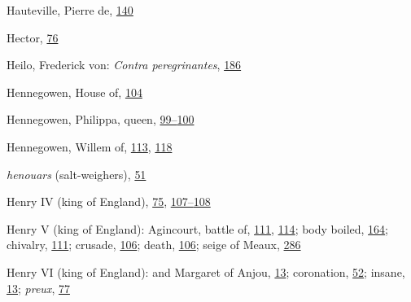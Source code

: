 Hauteville, Pierre de,
\protect\hyperlink{11_Chapter_Four__THE_FORMS_OF_LOVE.xhtmlux5cux23page_140}{140}

Hector,
\protect\hyperlink{10_Chapter_Three__THE_HEROIC_DREAM.xhtmlux5cux23page_76}{76}

Heilo, Frederick von: \emph{Contra peregrinantes},
\protect\hyperlink{13_Chapter_Six__THE_DEPICTION_OF_TH.xhtmlux5cux23page_186}{186}

Hennegowen, House of,
\protect\hyperlink{10_Chapter_Three__THE_HEROIC_DREAM.xhtmlux5cux23page_104}{104}

Hennegowen, Philippa, queen,
\protect\hyperlink{10_Chapter_Three__THE_HEROIC_DREAM.xhtmlux5cux23page_99}{99--}\protect\hyperlink{10_Chapter_Three__THE_HEROIC_DREAM.xhtmlux5cux23page_100}{100}

Hennegowen, Willem of,
\protect\hyperlink{10_Chapter_Three__THE_HEROIC_DREAM.xhtmlux5cux23page_113}{113},
\protect\hyperlink{10_Chapter_Three__THE_HEROIC_DREAM.xhtmlux5cux23page_118}{118}

\emph{henouars} (salt-weighers),
\protect\hyperlink{09_Chapter_Two__THE_CRAVING_FOR_A_M.xhtmlux5cux23page_51}{51}

Henry IV (king of England),
\protect\hyperlink{10_Chapter_Three__THE_HEROIC_DREAM.xhtmlux5cux23page_75}{75},
\protect\hyperlink{10_Chapter_Three__THE_HEROIC_DREAM.xhtmlux5cux23page_107}{107--}\protect\hyperlink{10_Chapter_Three__THE_HEROIC_DREAM.xhtmlux5cux23page_108}{108}

Henry V (king of England):
Agin\protect\hypertarget{25_INDEX.xhtmlux5cux23page_459}{}{}court,
battle of,
\protect\hyperlink{10_Chapter_Three__THE_HEROIC_DREAM.xhtmlux5cux23page_111}{111},
\protect\hyperlink{10_Chapter_Three__THE_HEROIC_DREAM.xhtmlux5cux23page_114}{114};
body boiled,
\protect\hyperlink{12_Chapter_Five__THE_VISION_OF_DEAT.xhtmlux5cux23page_164}{164};
chivalry,
\protect\hyperlink{10_Chapter_Three__THE_HEROIC_DREAM.xhtmlux5cux23page_111}{111};
crusade,
\protect\hyperlink{10_Chapter_Three__THE_HEROIC_DREAM.xhtmlux5cux23page_106}{106};
death,
\protect\hyperlink{10_Chapter_Three__THE_HEROIC_DREAM.xhtmlux5cux23page_106}{106};
seige of Meaux,
\protect\hyperlink{18_Chapter_Eleven__THE_FORMS_OF_THO.xhtmlux5cux23page_286}{286}

Henry VI (king of England): and Margaret of Anjou,
\protect\hyperlink{08_Chapter_One__THE_PASSIONATE_INTE.xhtmlux5cux23page_13}{13};
coronation,
\protect\hyperlink{09_Chapter_Two__THE_CRAVING_FOR_A_M.xhtmlux5cux23page_52}{52};
insane,
\protect\hyperlink{08_Chapter_One__THE_PASSIONATE_INTE.xhtmlux5cux23page_13}{13};
\emph{preux},
\protect\hyperlink{10_Chapter_Three__THE_HEROIC_DREAM.xhtmlux5cux23page_77}{77}

